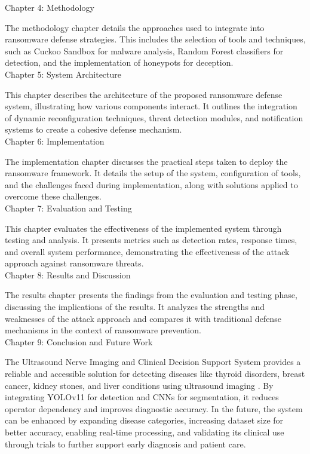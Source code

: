 \documentclass[12pt]{article}
\begin{document}
\noindent Chapter 4: Methodology

\noindent The methodology chapter details the approaches used to integrate into ransomware defense strategies. This includes the selection of tools and techniques, such as Cuckoo Sandbox for malware analysis, Random Forest classifiers for detection, and the implementation of honeypots for deception. \\[2pt]   

\noindent Chapter 5: System Architecture

\noindent This chapter describes the architecture of the proposed ransomware defense system, illustrating how various components interact. It outlines the integration of dynamic reconfiguration techniques, threat detection modules, and notification systems to create a cohesive defense mechanism. \\[2pt]

\noindent Chapter 6: Implementation

\noindent The implementation chapter discusses the practical steps taken to deploy the ransomware framework. It details the setup of the system, configuration of tools, and the challenges faced during implementation, along with solutions applied to overcome these challenges. \\[2pt]

\newpage
\noindent Chapter 7: Evaluation and Testing

\noindent This chapter evaluates the effectiveness of the implemented system through testing and analysis. It presents metrics such as detection rates, response times, and overall system performance, demonstrating the effectiveness of the attack approach against ransomware threats. \\[2pt]
	
\noindent Chapter 8: Results and Discussion

\noindent The results chapter presents the findings from the evaluation and testing phase, discussing the implications of the results. It analyzes the strengths and weaknesses of the attack approach and compares it with traditional defense mechanisms in the context of ransomware prevention. \\[2pt]

\noindent Chapter 9: Conclusion and Future Work

\noindent The Ultrasound Nerve Imaging and Clinical Decision Support System provides a reliable and accessible solution for detecting diseases like thyroid disorders, breast cancer, kidney stones, and liver conditions using ultrasound imaging . By integrating YOLOv11 for detection and CNNs for segmentation, it reduces operator dependency and improves diagnostic accuracy. In the future, the system can be enhanced by expanding disease categories, increasing dataset size for better accuracy, enabling real-time processing, and validating its clinical use through trials to further support early diagnosis and patient care. \\[2pt]
\\[2pt] 
\end{document}
